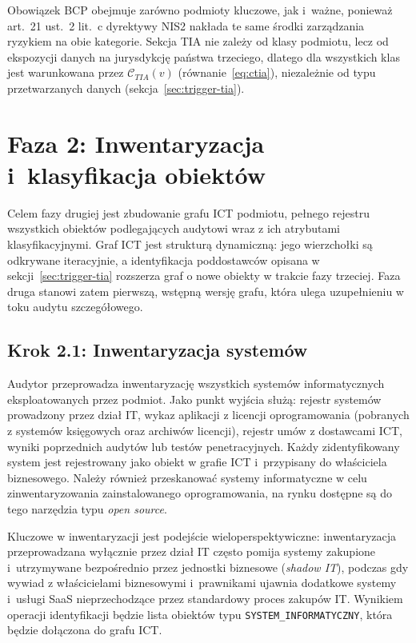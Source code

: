 \noindent Obowiązek BCP obejmuje zarówno podmioty kluczowe, jak i~ważne, ponieważ art.~21 ust.~2 lit.~c dyrektywy NIS2 nakłada te same środki zarządzania ryzykiem na obie kategorie. Sekcja TIA nie zależy od klasy podmiotu, lecz od ekspozycji danych na jurysdykcję państwa trzeciego, dlatego dla wszystkich klas jest warunkowana przez $\mathcal{C}_{TIA}(v)$ (równanie~\eqref{eq:ctia}), niezależnie od typu przetwarzanych danych (sekcja~\ref{sec:trigger-tia}).

\section{Faza 2: Inwentaryzacja i~klasyfikacja obiektów}
\label{sec:faza2}

Celem fazy drugiej jest zbudowanie grafu ICT podmiotu,  pełnego rejestru wszystkich obiektów podlegających audytowi
wraz z ich atrybutami klasyfikacyjnymi. Graf ICT jest strukturą dynamiczną: jego wierzchołki są odkrywane
iteracyjnie, a identyfikacja poddostawców opisana w sekcji~\ref{sec:trigger-tia} rozszerza graf o nowe obiekty w trakcie fazy trzeciej. Faza druga stanowi zatem pierwszą, wstępną wersję grafu, która ulega uzupełnieniu w toku audytu szczegółowego.

\subsection{Krok 2.1: Inwentaryzacja systemów}
\label{sec:krok21}

Audytor przeprowadza inwentaryzację wszystkich systemów informatycznych eksploatowanych przez podmiot. Jako punkt wyjścia służą: rejestr systemów prowadzony przez dział IT, wykaz aplikacji z licencji oprogramowania (pobranych z systemów księgowych oraz archiwów licencji), rejestr umów z dostawcami ICT, wyniki poprzednich audytów lub testów penetracyjnych. Każdy zidentyfikowany system jest rejestrowany jako obiekt w grafie ICT i~przypisany do właściciela biznesowego.
Należy również przeskanować systemy informatyczne w celu zinwentaryzowania zainstalowanego oprogramowania, na rynku dostępne są do tego narzędzia typu \textit{open source}.

Kluczowe w inwentaryzacji jest podejście wieloperspektywiczne: inwentaryzacja przeprowadzana wyłącznie przez dział IT często pomija systemy zakupione i~utrzymywane bezpośrednio przez jednostki biznesowe (\textit{shadow IT}), podczas gdy wywiad z właścicielami biznesowymi i~prawnikami ujawnia dodatkowe systemy i~usługi SaaS nieprzechodzące przez standardowy proces zakupów IT.
Wynikiem operacji identyfikacji będzie lista obiektów typu \texttt{SYSTEM\_INFORMATYCZNY}, która będzie dołączona do grafu ICT.

